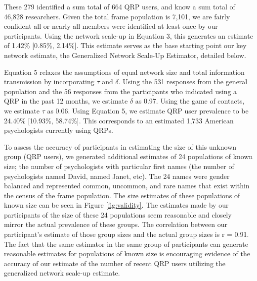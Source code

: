 \documentclass[jou]{apa6}
\theoremstyle{definition}
\theoremstyle{definition}
\theoremstyle{definition}
\theoremstyle{remark}
\begin{document}
These 279 identified a sum total of 664 QRP users, and know a sum total
of 46,828 researchers. Given the total frame population is 7,101, we are
fairly confident all or nearly all members were identified at least once
by our participants. Using the network scale-up in Equation 3, this
generates an estimate of 1.42\% {[}0.85\%, 2.14\%{]}. This estimate
serves as the base starting point our key network estimate, the
Generalized Network Scale-Up Estimator, detailed below.

Equation 5 relaxes the assumptions of equal network size and total
information transmission by incorporating \(\tau\) and \(\delta\). Using
the 531 responses from the general population and the 56 responses from
the participants who indicated using a QRP in the past 12 months, we
estimate \(\delta\) as 0.97. Using the game of contacts, we estimate
\(\tau\) as 0.06. Using Equation 5, we estimate QRP user prevalence to
be 24.40\% {[}10.93\%, 58.74\%{]}. This corresponds to an estimated
1,733 American psychologists currently using QRPs.

To assess the accuracy of participants in estimating the size of this
unknown group (QRP users), we generated additional estimates of 24
populations of known size; the number of psychologists with particular
first names (the number of psychologists named David, named Janet, etc).
The 24 names were gender balanced and represented common, uncommon, and
rare names that exist within the census of the frame population. The
size estimates of these populations of known size can be seen in Figure
\ref{fig:validity}. The estimates made by our participants of the size
of these 24 populations seem reasonable and closely mirror the actual
prevalence of these groups. The correlation between our participant's
estimate of those group sizes and the actual group sizes is r = 0.91.
The fact that the same estimator in the same group of participants can
generate reasonable estimates for populations of known size is
encouraging evidence of the accuracy of our estimate of the number of
recent QRP users utilizing the generalized network scale-up estimate.
\end{document}
